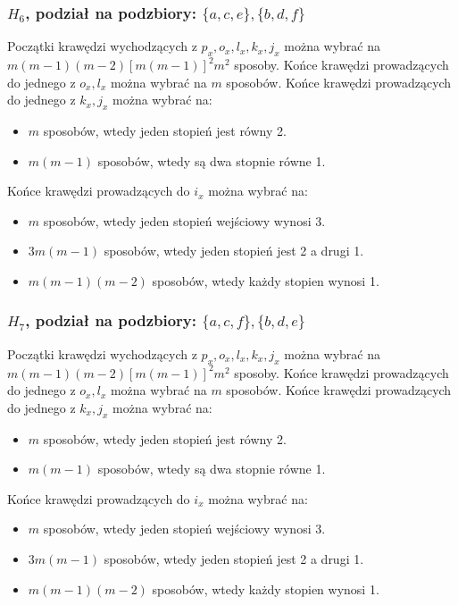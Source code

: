 \documentclass{article}
\begin{document}
\subsubsection{$H_6$, podział na podzbiory: $\{ a,c,e \}, \{ b,d,f \}$}
Początki krawędzi wychodzących z $p_x, o_x, l_x, k_x, j_x$ można wybrać na $m(m-1)(m-2)[m(m-1)]^2m^2$ sposoby. Końce krawędzi prowadzących do jednego z $o_x, l_x$ można wybrać na $m$ sposobów. Końce krawędzi prowadzących do jednego z $k_x,j_x$ można wybrać na:
\begin{itemize}
  \item $m$ sposobów, wtedy jeden stopień jest równy 2.
  \item $m(m-1)$ sposobów, wtedy są dwa stopnie równe 1.
\end{itemize}
Końce krawędzi prowadzących do $i_x$ można wybrać na:
\begin{itemize}
  \item $m$ sposobów, wtedy jeden stopień wejściowy wynosi 3.
  \item $3m(m-1)$ sposobów, wtedy jeden stopień jest 2 a drugi 1.
  \item $m(m-1)(m-2)$ sposobów, wtedy każdy stopien wynosi 1.
\end{itemize}

\subsubsection{$H_7$, podział na podzbiory: $\{ a,c,f \}, \{ b,d,e \}$}
Początki krawędzi wychodzących z $p_x, o_x, l_x, k_x, j_x$ można wybrać na $m(m-1)(m-2)[m(m-1)]^2m^2$ sposoby. Końce krawędzi prowadzących do jednego z $o_x, l_x$ można wybrać na $m$ sposobów. Końce krawędzi prowadzących do jednego z $k_x,j_x$ można wybrać na:
\begin{itemize}
  \item $m$ sposobów, wtedy jeden stopień jest równy 2.
  \item $m(m-1)$ sposobów, wtedy są dwa stopnie równe 1.
\end{itemize}
Końce krawędzi prowadzących do $i_x$ można wybrać na:
\begin{itemize}
  \item $m$ sposobów, wtedy jeden stopień wejściowy wynosi 3.
  \item $3m(m-1)$ sposobów, wtedy jeden stopień jest 2 a drugi 1.
  \item $m(m-1)(m-2)$ sposobów, wtedy każdy stopien wynosi 1.
\end{itemize}
\end{document}
